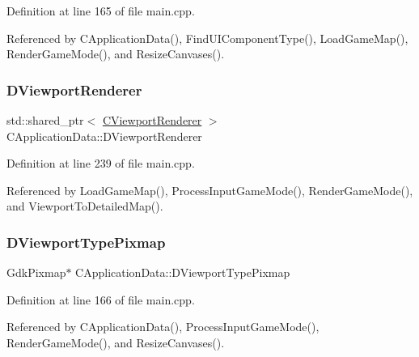 Definition at line 165 of file main.\+cpp.



Referenced by C\+Application\+Data(), Find\+U\+I\+Component\+Type(), Load\+Game\+Map(), Render\+Game\+Mode(), and Resize\+Canvases().

\hypertarget{classCApplicationData_a31da050ebca942272344c8b736d72848}{}\label{classCApplicationData_a31da050ebca942272344c8b736d72848} 
\subsubsection{\texorpdfstring{D\+Viewport\+Renderer}{DViewportRenderer}}
{\footnotesize\ttfamily std\+::shared\+\_\+ptr$<$ \hyperlink{classCViewportRenderer}{C\+Viewport\+Renderer} $>$ C\+Application\+Data\+::\+D\+Viewport\+Renderer\hspace{0.3cm}{\ttfamily [protected]}}



Definition at line 239 of file main.\+cpp.



Referenced by Load\+Game\+Map(), Process\+Input\+Game\+Mode(), Render\+Game\+Mode(), and Viewport\+To\+Detailed\+Map().

\hypertarget{classCApplicationData_a3a71a311e7bf0d4a002412343f69e794}{}\label{classCApplicationData_a3a71a311e7bf0d4a002412343f69e794} 
\subsubsection{\texorpdfstring{D\+Viewport\+Type\+Pixmap}{DViewportTypePixmap}}
{\footnotesize\ttfamily Gdk\+Pixmap$\ast$ C\+Application\+Data\+::\+D\+Viewport\+Type\+Pixmap\hspace{0.3cm}{\ttfamily [protected]}}



Definition at line 166 of file main.\+cpp.



Referenced by C\+Application\+Data(), Process\+Input\+Game\+Mode(), Render\+Game\+Mode(), and Resize\+Canvases().

\hypertarget{classCApplicationData_a306bba873ccc47126111305fe21ef3ff}{}\label{classCApplicationData_a306bba873ccc47126111305fe21ef3ff} 
